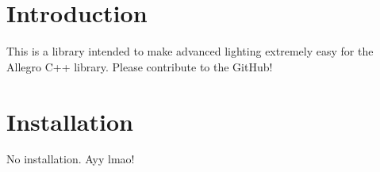 \hypertarget{index_intro_sec}{}\section{Introduction}\label{index_intro_sec}
This is a library intended to make advanced lighting extremely easy for the Allegro C++ library. Please contribute to the Git\+Hub! \hypertarget{index_install_sec}{}\section{Installation}\label{index_install_sec}
No installation. Ayy lmao! 